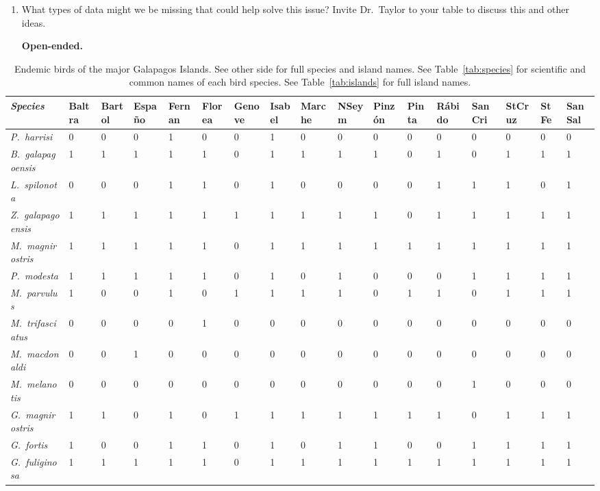\documentclass[11pt]{article}
\begin{document}
\begin{enumerate}[resume]
\item What types of data might we be missing that could help solve this issue? Invite Dr.~Taylor to your table to discuss this and other ideas.

\textbf{Open-ended.}
\end{enumerate}

\newpage



\newpage

\thispagestyle{empty}

\begin{landscape}


{\fontsize{10pt}{12pt}\selectfont
	
\begin{longtable}[l]{>{\em}lllllllllllllllll}
\caption{Endemic birds of the major Galapagos Islands. See other side for full species and island names. See Table~\ref{tab:species} for scientific and common names of each bird species.  See Table~\ref{tab:islands} for full island names.}\label{tab:endemic}\tabularnewline
\toprule
\textup{Species} & Baltra & Bartol & Españo & Fernan & Florea & Genove & Isabel & Marche & NSeym & Pinzón & Pinta & Rábido & SanCri & StCruz & StFe & SanSal \tabularnewline
\midrule
P.~harrisi & 0 & 0 & 0 & 1 & 0 & 0 & 1 & 0 & 0 & 0 & 0 & 0 & 0 & 0 & 0 & 0\tabularnewline
B.~galapagoensis & 1 & 1 & 1 & 1 & 1 & 0 & 1 & 1 & 1 & 1 & 0 & 1 & 0 & 1 & 1 & 1\tabularnewline
L.~spilonota & 0 & 0 & 0 & 1 & 1 & 0 & 1 & 0 & 0 & 0 & 0 & 1 & 1 & 1 & 0 & 1\tabularnewline
Z.~galapagoensis & 1 & 1 & 1 & 1 & 1 & 1 & 1 & 1 & 1 & 1 & 0 & 1 & 1 & 1 & 1 & 1\tabularnewline
M.~magnirostris & 1 & 1 & 1 & 1 & 1 & 0 & 1 & 1 & 1 & 1 & 1 & 1 & 1 & 1 & 1 & 1\tabularnewline
P.~modesta & 1 & 1 & 1 & 1 & 1 & 0 & 1 & 0 & 1 & 0 & 0 & 0 & 1 & 1 & 1 & 1\tabularnewline
M.~parvulus & 1 & 0 & 0 & 1 & 0 & 1 & 1 & 1 & 1 & 0 & 1 & 1 & 0 & 1 & 1 & 1\tabularnewline
M.~trifasciatus & 0 & 0 & 0 & 0 & 1 & 0 & 0 & 0 & 0 & 0 & 0 & 0 & 0 & 0 & 0 & 0\tabularnewline
M.~macdonaldi & 0 & 0 & 1 & 0 & 0 & 0 & 0 & 0 & 0 & 0 & 0 & 0 & 0 & 0 & 0 & 0\tabularnewline
M.~melanotis & 0 & 0 & 0 & 0 & 0 & 0 & 0 & 0 & 0 & 0 & 0 & 0 & 1 & 0 & 0 & 0\tabularnewline
G.~magnirostris & 1 & 1 & 0 & 1 & 0 & 1 & 1 & 1 & 1 & 1 & 1 & 1 & 0 & 1 & 1 & 1\tabularnewline
G.~fortis & 1 & 0 & 0 & 1 & 1 & 0 & 1 & 0 & 1 & 1 & 0 & 0 & 1 & 1 & 1 & 1\tabularnewline
G.~fuliginosa & 1 & 1 & 1 & 1 & 1 & 0 & 1 & 1 & 1 & 1 & 1 & 1 & 1 & 1 & 1 & 1\tabularnewline

\end{longtable}}
\end{landscape}
\end{document}
